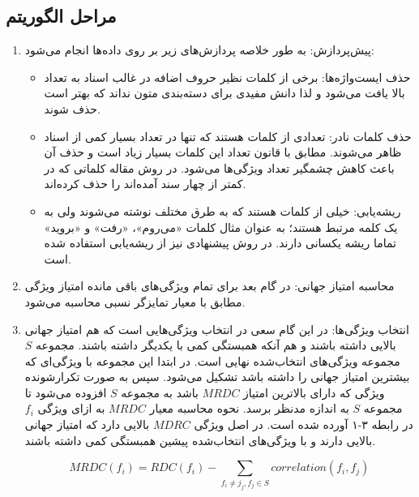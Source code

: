 \subsection{مراحل الگوریتم}

\begin{enumerate}
\item پیش‌پردازش: به طور خلاصه پردازش‌های زیر بر روی داده‌ها انجام می‌شود:

\begin{itemize}

\item حذف ایست‌واژه‌‌ها: برخی از کلمات نظیر حروف اضافه در غالب اسناد به تعداد بالا یافت می‌شود و لذا دانش مفیدی برای دسته‌بندی متون نداند که بهتر است حذف شوند.
\item حذف کلمات نادر: تعدادی از کلمات هستند که تنها در تعداد بسیار کمی از اسناد ظاهر می‌شوند. مطابق با قانون  تعداد این کلمات بسیار زیاد است و حذف آن باعث کاهش چشمگیر تعداد ویژگی‌ها می‌شود. در روش مقاله کلماتی که در کمتر از چهار سند آمده‌اند را حذف کرده‌اند.
\item ریشه‌یابی: خیلی از کلمات هستند که به طرق مختلف نوشته می‌شوند ولی به یک کلمه مرتبط هستند؛ به عنوان مثال کلمات «می‌روم»، «رفت» و «بروید» تماما ریشه یکسانی دارند. در روش پیشنهادی نیز از ریشه‌یابی استفاده شده است.
\end{itemize}

\item محاسبه امتیاز جهانی: در گام بعد برای تمام ویژگی‌های باقی مانده امتیاز ویژگی مطابق با معیار تمایزگر نسبی محاسبه می‌شود.

\item انتخاب ویژگی‌‌ها: در این گام سعی در انتخاب ویژگی‌هایی است که هم امتیاز جهانی بالایی داشته باشند و هم آنکه همبستگی کمی با یکدیگر داشته باشند. مجموعه 
$S$
مجموعه ویژگی‌های انتخاب‌شده نهایی است. در ابتدا این مجموعه با ویژگی‌ای که بیشترین امتیاز جهانی را داشته باشد تشکیل می‌شود. سپس به صورت تکرارشونده ویژگی که دارای بالاترین امتیاز 
$MRDC$
باشد به مجموعه
$S$
افزوده می‌شود تا مجموعه
$S$
به اندازه مدنظر برسد. نحوه محاسبه معیار
$MRDC$
به ازای ویژگی 
$f_i$
در رابطه ۳-۱ آورده شده است. در اصل ویژگی $MDRC$ بالایی دارد که امتیاز جهانی بالایی دارند و با ویژگی‌های انتخاب‌شده پیشین همبستگی کمی داشته باشند.

\begin{equation}
MRDC(f_i) = RDC(f_i) - \sum_{f_i \ne j_j, f_j \in S} correlation(f_i, f_j)
\end{equation}
 
\end{enumerate}


